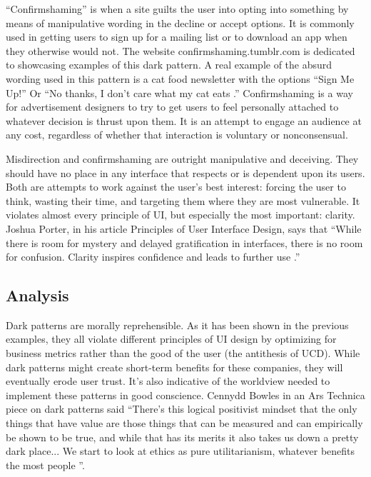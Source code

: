\documentclass[12pt, oneside]{article}
\begin{document}
``Confirmshaming'' is when a site guilts the user into opting into something by means of manipulative wording in the decline or accept options. It is commonly used in getting users to sign up for a mailing list or to download an app when they otherwise would not. The website confirmshaming.tumblr.com is dedicated to showcasing examples of this dark pattern. A real example of the absurd wording used in this pattern is a cat food newsletter with the options ``Sign Me Up!'' Or ``No thanks, I don't care what my cat eats \cite{confirmshaming}.'' Confirmshaming is a way for advertisement designers to try to get users to feel personally attached to whatever decision is thrust upon them. It is an attempt to engage an audience at any cost, regardless of whether that interaction is voluntary or nonconsensual.

Misdirection and confirmshaming are outright manipulative and deceiving. They should have no place in any interface that respects or is dependent upon its users. Both are attempts to work against the user's best interest: forcing the user to think, wasting their time, and targeting them where they are most vulnerable. It violates almost every principle of UI, but especially the most important: clarity. Joshua Porter, in his article Principles of User Interface Design, says that ``While there is room for mystery and delayed gratification in interfaces, there is no room for confusion. Clarity inspires confidence and leads to further use \cite{porter}.''

\subsection{Analysis}

Dark patterns are morally reprehensible. As it has been shown in the previous examples, they all violate different principles of UI design by optimizing for business metrics rather than the good of the user (the antithesis of UCD). While dark patterns might create short-term benefits for these companies, they will eventually erode user trust. It's also indicative of the worldview needed to implement these patterns in good conscience. Cennydd Bowles in an Ars Technica piece on dark patterns said ``There’s this logical positivist mindset that the only things that have value are those things that can be measured and can empirically be shown to be true, and while that has its merits it also takes us down a pretty dark place... We start to look at ethics as pure utilitarianism, whatever benefits the most people \cite{grauer_2016}''.
\end{document}
